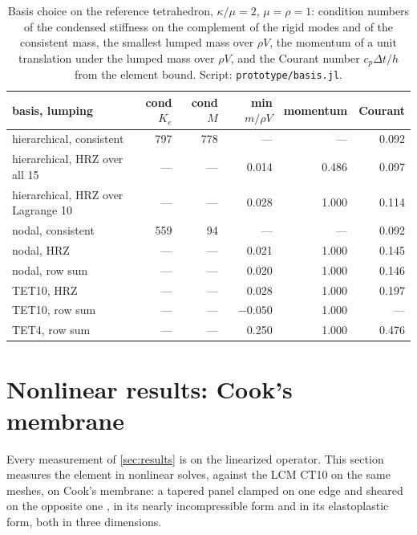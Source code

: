 \documentclass{article}
\newcommand{\code}[1]{\texttt{#1}}
\theoremstyle{definition}
\theoremstyle{plain}
\begin{document}
\begin{table}[tbp]
\centering
\caption{Basis choice on the reference tetrahedron, $\kappa/\mu = 2$,
$\mu = \rho = 1$: condition numbers of the condensed stiffness on the
complement of the rigid modes and of the consistent mass, the smallest
lumped mass over $\rho V$, the momentum of a unit translation under the
lumped mass over $\rho V$, and the Courant number $c_p\Delta t/h$ from the
element bound. Script: \code{prototype/basis.jl}.}
\label{tab:basis}
\begin{tabular}{@{}lrrrrr@{}}
\toprule
basis, lumping & cond $~K_e$ & cond $~M$ & min $m/\rho V$ & momentum & Courant \\
\midrule
hierarchical, consistent            & 797 & 778 & ---    & ---   & 0.092 \\
hierarchical, HRZ over all 15       & --- & --- & 0.014  & 0.486 & 0.097 \\
hierarchical, HRZ over Lagrange 10  & --- & --- & 0.028  & 1.000 & 0.114 \\
nodal, consistent                   & 559 & 94  & ---    & ---   & 0.092 \\
nodal, HRZ                          & --- & --- & 0.021  & 1.000 & 0.145 \\
nodal, row sum                      & --- & --- & 0.020  & 1.000 & 0.146 \\
TET10, HRZ                 & --- & --- & 0.028  & 1.000 & 0.197 \\
TET10, row sum             & --- & --- & $-0.050$ & 1.000 & --- \\
TET4, row sum              & --- & --- & 0.250  & 1.000 & 0.476 \\
\bottomrule
\end{tabular}
\end{table}

\section{Nonlinear results: Cook's membrane}
\label{sec:cook}

Every measurement of \cref{sec:results} is on the linearized operator.
This section measures the element in nonlinear solves, against the
LCM CT10 on the same meshes, on Cook's membrane:
a tapered panel clamped on one edge and sheared on the opposite one
\cite{Cook:1974}, in its nearly incompressible form \cite{SimoArmero:1992}
and in its elastoplastic form, both in three dimensions.
\end{document}
